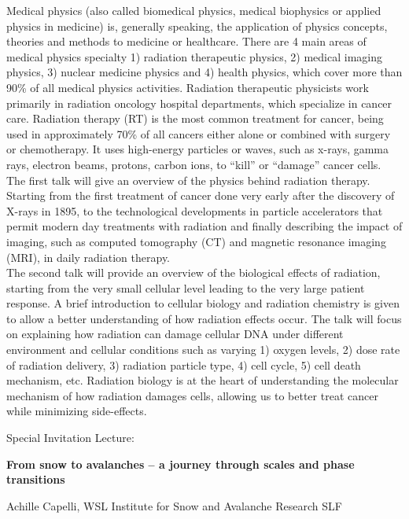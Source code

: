 Medical physics (also called biomedical physics, medical biophysics or applied physics in medicine) is, generally speaking, the application of physics concepts, theories and methods to medicine or healthcare. There are 4 main areas of medical physics specialty 1) radiation therapeutic physics, 2) medical imaging physics, 3) nuclear medicine physics and 4) health physics, which cover more than 90\% of all medical physics activities. Radiation therapeutic physicists work primarily in radiation oncology hospital departments, which specialize in cancer care. Radiation therapy (RT) is the most common treatment for cancer, being used in approximately 70\% of all cancers either alone or combined with surgery or chemotherapy. It uses high-energy particles or waves, such as x-rays, gamma rays, electron beams, protons, carbon ions, to \enquote{kill} or \enquote{damage} cancer cells. ​
\\
The first talk will give an overview of the physics behind radiation therapy. Starting from the first treatment of cancer done very early after the discovery of X-rays in 1895, to the technological developments in particle accelerators that permit modern day treatments with radiation and finally describing the impact of imaging, such as computed tomography (CT) and magnetic resonance imaging (MRI), in daily radiation therapy.
\\
The second talk will provide an overview of the biological effects of radiation, starting from the very small cellular level leading to the very large patient response. A brief introduction to cellular biology and radiation chemistry is given to allow a better understanding of how radiation effects occur. The talk will focus on explaining how radiation can damage cellular DNA under different environment and cellular conditions such as varying 1) oxygen levels, 2) dose rate of radiation delivery, 3) radiation particle type, 4) cell cycle, 5) cell death mechanism, etc. Radiation biology is at the heart of understanding the molecular mechanism of how radiation damages cells, allowing us to better treat cancer while minimizing side-effects.


\noindent 
\par
\newpage



{{\Large \noindent Special Invitation Lecture: }\par} \medskip

\begin{center}
{{\large\bfseries From snow to avalanches – a journey through scales and phase transitions }\par} \medskip

{\large Achille Capelli, WSL Institute for Snow and Avalanche Research SLF\par}
\end{center}

